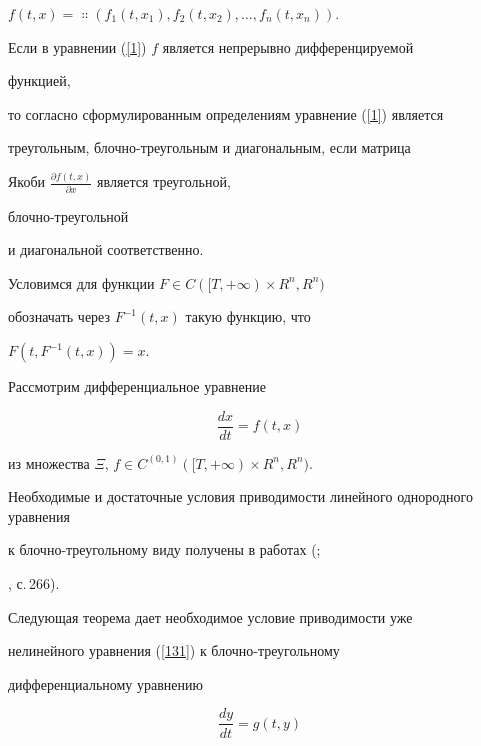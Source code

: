 $f(t,x)=\Colon(f_{1}(t,x_{1}),f_{2}(t,x_{2}),\dotsc,f_{n}(t,x_{n}))$.





Если в уравнении (\ref{1}) $f$ является непрерывно дифференцируемой


функцией,


то согласно сформулированным определениям уравнение (\ref{1}) является


треугольным, блочно-треугольным и диагональным, если матрица


Якоби $\frac{\partial f(t,x)}{\partial x}$ является треугольной,


блочно-треугольной


и диагональной соответственно.





Условимся для функции $F\in C([T,+\infty)\times R^{n},R^{n})$


обозначать через $F^{-1}(t,x)$ такую функцию, что


$F(t,F^{-1}(t,x))=x$.





Рассмотрим дифференциальное уравнение


\begin{equation}


\label{131}


\frac{dx}{dt}=f(t,x)


\end{equation}


из множества $\Xi$, $f\in C^{(0,1)}([T,+\infty)\times R^{n},R^{n})$.





Необходимые и достаточные условия приводимости линейного однородного уравнения


к блочно-треугольному виду получены в работах (\cite{BilOb};


\cite{BilTe}, с.\,266).


Следующая теорема дает необходимое условие приводимости уже


нелинейного уравнения (\ref{131}) к блочно-треугольному


дифференциальному уравнению


\begin{equation}


\label{10}


\frac{dy}{dt}=g(t,y)


\end{equation}


